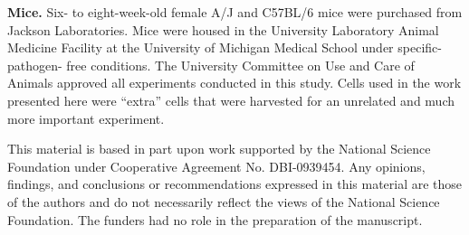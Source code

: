 \documentclass[fleqn,10pt]{wlpeerj}
\begin{document}
{\bf Mice.} Six- to eight-week-old female A/J and C57BL/6 mice were purchased
from Jackson Laboratories. Mice were housed in the University Laboratory
Animal Medicine Facility at the University of Michigan Medical School under
specific-pathogen- free conditions. The University Committee on Use and Care
of Animals approved all experiments conducted in this study. Cells used in the
work presented here were ``extra'' cells that were harvested for an unrelated
and much more important experiment.

\noindent This material is based in part upon work supported by the National
Science Foundation under Cooperative Agreement No. DBI-0939454. Any opinions,
findings, and conclusions or recommendations expressed in this material are
those of the authors and do not necessarily reflect the views of the National
Science Foundation. The funders had no role in the preparation of the
manuscript.



\end{document}
